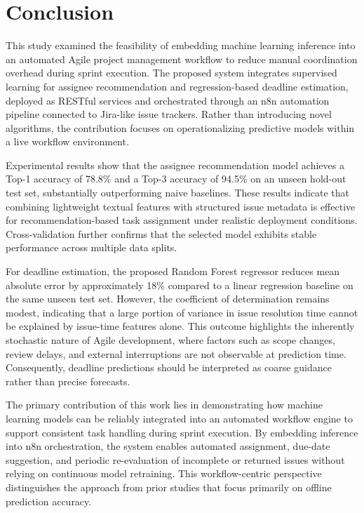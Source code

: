 \documentclass[conference]{IEEEtran}
\begin{document}
\section{Conclusion}

This study examined the feasibility of embedding machine learning inference into an automated Agile project management workflow to reduce manual coordination overhead during sprint execution. The proposed system integrates supervised learning for assignee recommendation and regression-based deadline estimation, deployed as RESTful services and orchestrated through an n8n automation pipeline connected to Jira-like issue trackers. Rather than introducing novel algorithms, the contribution focuses on operationalizing predictive models within a live workflow environment.

Experimental results show that the assignee recommendation model achieves a Top-1 accuracy of 78.8\% and a Top-3 accuracy of 94.5\% on an unseen hold-out test set, substantially outperforming naive baselines. These results indicate that combining lightweight textual features with structured issue metadata is effective for recommendation-based task assignment under realistic deployment conditions. Cross-validation further confirms that the selected model exhibits stable performance across multiple data splits.

For deadline estimation, the proposed Random Forest regressor reduces mean absolute error by approximately 18\% compared to a linear regression baseline on the same unseen test set. However, the coefficient of determination remains modest, indicating that a large portion of variance in issue resolution time cannot be explained by issue-time features alone. This outcome highlights the inherently stochastic nature of Agile development, where factors such as scope changes, review delays, and external interruptions are not observable at prediction time. Consequently, deadline predictions should be interpreted as coarse guidance rather than precise forecasts.

The primary contribution of this work lies in demonstrating how machine learning models can be reliably integrated into an automated workflow engine to support consistent task handling during sprint execution. By embedding inference into n8n orchestration, the system enables automated assignment, due-date suggestion, and periodic re-evaluation of incomplete or returned issues without relying on continuous model retraining. This workflow-centric perspective distinguishes the approach from prior studies that focus primarily on offline prediction accuracy.
\end{document}
